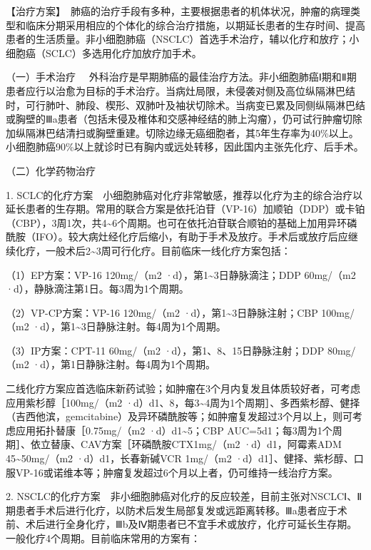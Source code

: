 【治疗方案】　肺癌的治疗手段有多种，主要根据患者的机体状况，肿瘤的病理类型和临床分期采用相应的个体化的综合治疗措施，以期延长患者的生存时间、提高患者的生活质量。非小细胞肺癌（NSCLC）首选手术治疗，辅以化疗和放疗；小细胞癌（SCLC）多选用化疗加放疗加手术。

{（一）手术治疗}
　外科治疗是早期肺癌的最佳治疗方法。非小细胞肺癌Ⅰ期和Ⅱ期患者应行以治愈为目标的手术治疗。当病灶局限，未侵袭对侧及高位纵隔淋巴结时，可行肺叶、肺段、楔形、双肺叶及袖状切除术。当病变已累及同侧纵隔淋巴结或胸壁的Ⅲa患者（包括未侵及椎体和交感神经结的肺上沟瘤），仍可试行肿瘤切除加纵隔淋巴结清扫或胸壁重建。切除边缘无癌细胞者，其5年生存率为40\%以上。小细胞肺癌90\%以上就诊时已有胸内或远处转移，因此国内主张先化疗、后手术。

{（二）化学药物治疗}

1.
SCLC的化疗方案　小细胞肺癌对化疗非常敏感，推荐以化疗为主的综合治疗以延长患者的生存期。常用的联合方案是依托泊苷（VP-16）加顺铂（DDP）或卡铂（CBP），3周1次，共4\textasciitilde{}6个周期。也可在依托泊苷联合顺铂的基础上加用异环磷酰胺（IFO）。较大病灶经化疗后缩小，有助于手术及放疗。手术后或放疗后应继续化疗，一般术后2\textasciitilde{}3周可行化疗。目前临床一线化疗方案包括：

（1）EP方案：VP-16 120mg/（m{2}
·d），第1\textasciitilde{}3日静脉滴注；DDP 60mg/（m{2}
·d），静脉滴注第1日。每3周为1个周期。

（2）VP-CP方案：VP-16 120mg/（m{2}
·d），第1\textasciitilde{}3日静脉注射；CBP 100mg/（m{2}
·d），第1\textasciitilde{}3日静脉注射。每4周为1个周期。

（3）IP方案：CPT-11 60mg/（m{2} ·d），第1、8、15日静脉注射；DDP
80mg/（m{2} ·d），第1日静脉注射。每4周为1个周期。

二线化疗方案应首选临床新药试验；如肿瘤在3个月内复发且体质较好者，可考虑应用紫杉醇［100mg/（m{2}
·d）d1、8，每3\textasciitilde{}4周为1个周期］、多西紫杉醇、健择（吉西他滨，gemcitabine）及异环磷酰胺等；如肿瘤复发超过3个月以上，则可考虑应用拓扑替康［0.75mg/（m{2}
·d）d1\textasciitilde{}5；CBP
AUC=5d1；每3周为1个周期］、依立替康、CAV方案［环磷酰胺CTX1mg/（m{2}
·d）d1，阿霉素ADM 45\textasciitilde{}50mg/（m{2} ·d）d1，长春新碱VCR
1mg/（m{2}
·d）d1］、健择、紫杉醇、口服VP-16或诺维本等；肿瘤复发超过6个月以上者，仍可维持一线治疗方案。

2.
NSCLC的化疗方案　非小细胞肺癌对化疗的反应较差，目前主张对NSCLCⅠ、Ⅱ期患者手术后进行化疗，以防术后发生局部复发或远距离转移。Ⅲa患者应于术前、术后进行全身化疗，Ⅲb及Ⅳ期患者已不宜手术或放疗，化疗可延长生存期。一般化疗4个周期。目前临床常用的方案有：

